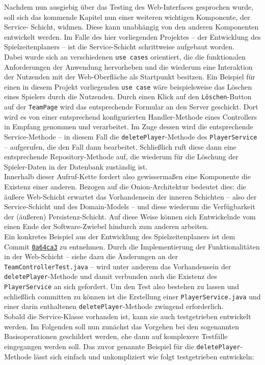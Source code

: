 
Nachdem nun ausgiebig über das Testing des Web-Interfaces gesprochen wurde, soll 
sich das kommende Kapitel nun einer weiteren wichtigen Komponente, der Service-
Schicht, widmen. Diese kann unabhängig von den anderen Komponenten entwickelt werden. 
Im Falle des hier vorliegenden Projektes -- der Entwicklung des Spielzeitenplaners 
-- ist die Service-Schicht schrittweise aufgebaut worden. \\ 
Dabei wurde sich an verschiedenen \texttt{use cases} orientiert, die die 
funktionalen Anforderungen der Anwendung hervorheben und die wiederum eine 
Interaktion der Nutzenden mit der Web-Oberfläche als Startpunkt besitzen. Ein 
Beispiel für einen in diesem Projekt vorliegenden \texttt{use case} wäre 
beispielsweise das Löschen eines Spielers durch die Nutzenden. Durch einen Klick 
auf den \texttt{Löschen}-Button auf der \texttt{TeamPage} wird das entsprechende 
Formular an den Server geschickt. Dort wird es von einer entsprechend 
konfigurierten Handler-Methode eines Controllers in Empfang genommen und 
verarbeitet. Im Zuge dessen wird die entsprechende Service-Methode -- in diesem 
Fall die \texttt{deletePlayer}-Methode des \texttt{PlayerService} -- aufgerufen, 
die den Fall dann bearbeitet. Schließlich ruft diese dann eine entsprechende 
Repository-Methode auf, die wiederum für die Löschung der Spieler-Daten in der 
Datenbank zuständig ist. \\ 
Innerhalb dieser Aufruf-Kette fordert also gewissermaßen eine Komponente die 
Existenz einer anderen. Bezogen auf die Onion-Architektur bedeutet dies: die äußere 
Web-Schicht erwartet das Vorhandensein der inneren Schichten -- also der 
Service-Schicht und des Domain-Models -- und diese wiederum die Verfügbarkeit der 
(äußeren) Persistenz-Schicht. Auf diese Weise können sich Entwickelnde vom einen 
Ende der Software-Zwiebel hindurch zum anderen arbeiten. \\ 
Ein konkretes Beispiel aus der Entwicklung des Spielzeitenplaners ist dem Commit 
\href{https://github.com/FlorianOhmes/bat_spielzeitenplaner/commit/0a64ca3359402c06358b43cc41236ca24c2ec9cd#diff-c21f1f59588419db3d2efda09d4e20682f83653b4ef81ca9847d7458bc5b2f5f}{\texttt{0a64ca3}}
zu entnehmen. Durch die Implementierung der Funktionalitäten in der Web-Schicht -- 
siehe dazu die Änderungen an der \texttt{TeamControllerTest.java} -- wird unter 
anderem das Vorhandensein der \texttt{deletePlayer}-Methode und damit verbunden auch 
die Existenz des \texttt{PlayerService} an sich gefordert. Um den Test also bestehen 
zu lassen und schließlich committen zu können ist die Erstellung einer 
\texttt{PlayerService.java} und einer darin enthaltenen \texttt{deletePlayer}-Methode 
zwingend erforderlich. \\ 
Sobald die Service-Klasse vorhanden ist, kann sie auch testgetrieben entwickelt 
werden. Im Folgenden soll nun zunächst das Vorgehen bei den sogenannten 
Basisoperationen geschildert werden, ehe dann auf komplexere Testfälle eingegangen 
werden soll. Das zuvor genannte Beispiel für die \texttt{deletePlayer}-Methode lässt 
sich einfach und unkompliziert wie folgt testgetrieben entwickeln: 


